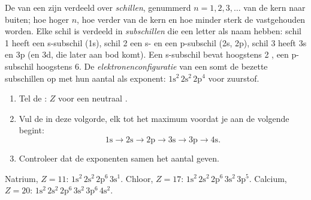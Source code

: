 \begin{definition}\label{def:g10:electron-shells:configuration}
De  van een  zijn verdeeld over \emph{schillen},
genummerd $n = 1, 2, 3, \ldots$ van de kern naar buiten; hoe hoger $n$,
hoe verder van de kern en hoe minder sterk de  vastgehouden
worden. Elke schil is verdeeld in \emph{subschillen} die
een letter als naam hebben: schil 1 heeft een s-subschil (1s), schil 2
een s- en een p-subschil (2s, 2p), schil 3 heeft 3s en 3p (en 3d, die
later aan bod komt). Een s-subschil bevat hoogstens 2 , een
p-subschil hoogstens 6. De
\emph{elektronenconfiguratie} van een 
somt de bezette subschillen op met hun aantal  als exponent:
$1\mathrm{s}^2\,2\mathrm{s}^2\,2\mathrm{p}^4$ voor zuurstof.
\end{definition}

\begin{method}[Een elektronenconfiguratie opschrijven, tot $Z = 20$]\label{met:g10:electron-shells:write}
\begin{enumerate}
  \item Tel de : $Z$ voor een neutraal .
  \item Vul de  in deze volgorde, elk tot het maximum voordat
        je aan de volgende begint:
        \[
          1\mathrm{s} \to 2\mathrm{s} \to 2\mathrm{p} \to 3\mathrm{s} \to
          3\mathrm{p} \to 4\mathrm{s}.
        \]
  \item Controleer dat de exponenten samen het aantal  geven.
\end{enumerate}
Natrium, $Z = 11$: $1\mathrm{s}^2\,2\mathrm{s}^2\,2\mathrm{p}^6\,3\mathrm{s}^1$.
Chloor, $Z = 17$: $1\mathrm{s}^2\,2\mathrm{s}^2\,2\mathrm{p}^6\,3\mathrm{s}^2\,3\mathrm{p}^5$.
Calcium, $Z = 20$: $1\mathrm{s}^2\,2\mathrm{s}^2\,2\mathrm{p}^6\,3\mathrm{s}^2\,3\mathrm{p}^6\,4\mathrm{s}^2$.
\end{method}

